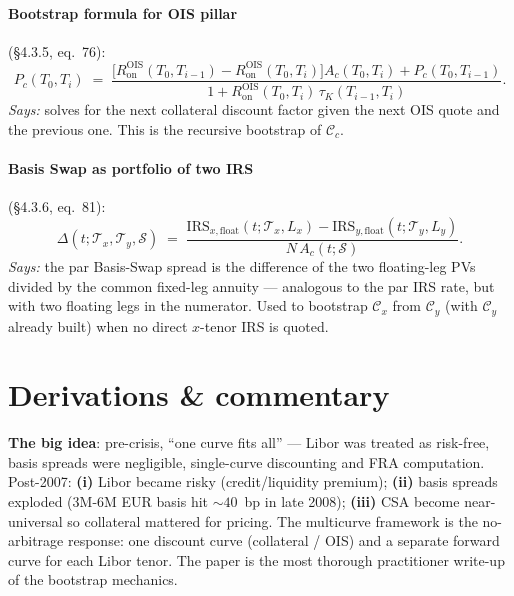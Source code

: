 \documentclass[11pt,a4paper]{article}
\begin{document}
\paragraph{Bootstrap formula for OIS pillar} (\S4.3.5, eq.~76):
\begin{equation}\label{eq:mc-ois-boot}
  P_c(T_0, T_i)
  \;=\; \frac{\bigl[R^{\text{OIS}}_{\text{on}}(T_0, T_{i-1}) - R^{\text{OIS}}_{\text{on}}(T_0, T_i)\bigr] A_c(T_0, T_i) + P_c(T_0, T_{i-1})}
              {1 + R^{\text{OIS}}_{\text{on}}(T_0, T_i)\, \tau_K(T_{i-1}, T_i)}.
\end{equation}
\textit{Says:} solves for the next collateral discount factor given
the next OIS quote and the previous one. This is the recursive
bootstrap of $\mathcal{C}_c$.

\paragraph{Basis Swap as portfolio of two IRS} (\S4.3.6, eq.~81):
\begin{equation}\label{eq:mc-basis}
  \Delta(t; \mathcal{T}_x, \mathcal{T}_y, \mathcal{S})
  \;=\; \frac{\text{IRS}_{x,\text{float}}(t; \mathcal{T}_x, L_x) - \text{IRS}_{y,\text{float}}(t; \mathcal{T}_y, L_y)}{N\, A_c(t; \mathcal{S})}.
\end{equation}
\textit{Says:} the par Basis-Swap spread is the difference of the
two floating-leg PVs divided by the common fixed-leg annuity ---
analogous to the par IRS rate, but with two floating legs in the
numerator. Used to bootstrap $\mathcal{C}_x$ from $\mathcal{C}_y$
(with $\mathcal{C}_y$ already built) when no direct $x$-tenor IRS is
quoted.

\section{Derivations \& commentary}

\begin{commentary}
\textbf{The big idea}: pre-crisis, ``one curve fits all'' --- Libor
was treated as risk-free, basis spreads were negligible,
single-curve discounting and FRA computation. Post-2007:
\textbf{(i)} Libor became risky (credit/liquidity premium); \textbf{(ii)} basis
spreads exploded (3M-6M EUR basis hit $\sim 40$~bp in late 2008);
\textbf{(iii)} CSA become near-universal so collateral mattered for
pricing. The multicurve framework is the no-arbitrage response:
one discount curve (collateral / OIS) and a separate forward curve
for each Libor tenor. The paper is the most thorough practitioner
write-up of the bootstrap mechanics.
\end{commentary}
\end{document}
